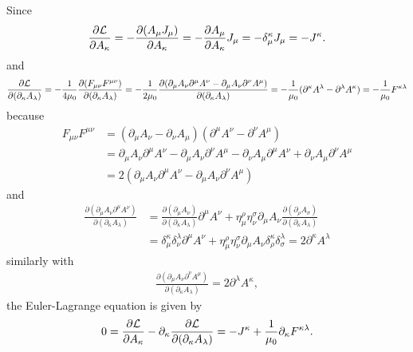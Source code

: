 \documentclass{../../large}
\begin{document}
Since
\begin{align*}
\frac{\partial\mathcal{L}}{\partial A_\kappa}
=-\frac{\partial(A_\mu J_\mu)}{\partial A_\kappa}
=-\frac{\partial A_\mu}{\partial A_\kappa}J_\mu
=-\delta_\mu^\kappa J_\mu
=-J^\kappa.
\end{align*}
and
\begin{align*}
\frac{\partial\mathcal{L}}{\partial(\partial_\kappa A_\lambda)}
=-\frac1{4\mu_0}\frac{\partial(F_{\mu\nu}F^{\mu\nu})}{\partial(\partial_\kappa A_\lambda)}
=-\frac1{2\mu_0}\frac{\partial(\partial_\mu A_\nu\partial^\mu A^\nu-\partial_\mu A_\nu\partial^\nu A^\mu)}{\partial(\partial_\kappa A_\lambda)}
=-\frac1{\mu_0}(\partial^\kappa A^\lambda-\partial^\lambda A^\kappa)
=-\frac1{\mu_0}F^{\kappa\lambda}
\end{align*}
because
\begin{align*}
F_{\mu\nu}F^{\mu\nu}
&=(\partial_\mu A_\nu-\partial_\nu A_\mu)(\partial^\mu A^\nu-\partial^\nu A^\mu)\\
&=\partial_\mu A_\nu\partial^\mu A^\nu-\partial_\mu A_\nu\partial^\nu A^\mu-\partial_\nu A_\mu\partial^\mu A^\nu+\partial_\nu A_\mu\partial^\nu A^\mu\\
&=2(\partial_\mu A_\nu\partial^\mu A^\nu-\partial_\mu A_\nu\partial^\nu A^\mu)
\end{align*}
and
\begin{align*}
\frac{\partial(\partial_\mu A_\nu\partial^\mu A^\nu)}{\partial(\partial_\kappa A_\lambda)}
&=\frac{\partial(\partial_\mu A_\nu)}{\partial(\partial_\kappa A_\lambda)}\partial^\mu A^\nu+\eta_\mu^\rho\eta_\nu^\sigma\partial_\mu A_\nu\frac{\partial(\partial_\rho A_\sigma)}{\partial(\partial_\kappa A_\lambda)}\\
&=\delta_\mu^\kappa\delta_\nu^\lambda\partial^\mu A^\nu+\eta_\mu^\rho\eta_\nu^\sigma\partial_\mu A_\nu\delta_\rho^\kappa\delta^\lambda_\sigma
=2\partial^\kappa A^\lambda
\end{align*}
similarly with
\begin{align*}
\frac{\partial(\partial_\mu A_\nu\partial^\nu A^\mu)}{\partial(\partial_\kappa A_\lambda)}
=2\partial^\lambda A^\kappa,
\end{align*}
the Euler-Lagrange equation is given by
\begin{align*}
0=\frac{\partial\mathcal{L}}{\partial A_\kappa}-\partial_\kappa\frac{\partial\mathcal{L}}{\partial(\partial_\kappa A_\lambda)}
=-J^\kappa+\frac1{\mu_0}\partial_\kappa F^{\kappa\lambda}.
\end{align*}



\begin{prb}
\end{prb}
\end{document}
